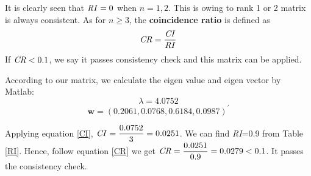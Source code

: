 It is clearly seen that $\mbox{\textit{RI}}=0$ when $n=1,2$. This is owing to rank 1 or 2 matrix is always consistent. As for $n\geq 3$, the \textbf{coincidence ratio} is defined as
\begin{equation}\label{CR}
\mbox{\textit{CR}}=\dfrac{\mbox{\textit{CI}}}{\mbox{\textit{RI}}}
\end{equation}
If $\mbox{\textit{CR}}<0.1$, we say it passes consistency check and this matrix can be applied.

According to our matrix, we calculate the eigen value and eigen vector by Matlab:
\begin{equation}
\lambda=4.0752
\end{equation}
\begin{equation}
\textbf{w}=(0.2061,0.0768,0.6184,0.0987)^\prime
\end{equation}\label{vector1}

Applying equation \ref{CI}, $\mbox{\textit{CI}}= \dfrac{0.0752}{3}=0.0251$. We can find \textit{RI}=0.9 from Table \ref{RI}. Hence, follow equation \ref{CR} we get $\mbox{\textit{CR}}=\dfrac{0.0251}{0.9}=0.0279<0.1$. It passes the consistency check.


